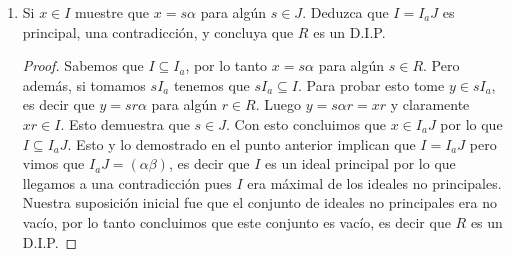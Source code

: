 \documentclass[letter,twoside,12pt]{article}
\begin{document}
\begin{enumerate}[label=\textbf{(\alph*)}]
\begin{proof}
Para demostrar que $ J $ es un ideal tomemos $ c,d \in J $, y tomemos $ x \in (d - c)I_a  $. Entonces $x = (d-c)e $ con $ e \in I_a $. Pero $ x = ce-de $ y vemos que $ce$ y $de \in I$. Por lo tanto, como $I$ es cerrado bajo resta $ x=cd-bd \in I $. Por lo tanto $J$ también es cerrado bajo resta. Por una demostración similar podemos mostrar que $rj \in J$ con $r \in R$ y $ j \in J $. Luego $ J $ es un ideal. Además tenemos que $ I \subseteq J $, pues si tomamos $ i \in I $ entonces $iI_j \subseteq I$ es trivial porque $I$ es un ideal. Pero la contenencia es estricta pues $ b \in J $ y $b \not  \in I$ por nuestra suposición. En efecto tomemos $ bI_a $, y tomemos cualquier elemento $x \in bI_a$. Entonces $x=b(i+ra)$, con $ i \in I $, y $r \in R$. Esto también muestra que $ I_b \in J$. Por lo tanto, $x=ib+rab$ pertenece a $ I $ porque $ i $ y $ab$ estan en $ I $. Luego $J$ también es un ideal principal porque si no lo fuera contradeciría la maximalidad de $ I $.

Por ultimo, probemos que $ (\alpha\beta) \subseteq I $. En efecto, $ \beta \in J $ luego tenemos que $ \beta I_a \subseteq I$ y $\alpha \in I_a$ por lo que $ \beta\alpha \in I $.
\end{proof}
\item Si $ x \in I $ muestre que $ x = s\alpha $ para algún $ s \in J $. Deduzca que $ I = I_aJ $ es principal, una contradicción, y concluya que $ R $ es un D.I.P.

\begin{proof}
Sabemos que $ I \subseteq I_a $, por lo tanto $x=s\alpha$ para algún $ s \in R $. Pero además, si tomamos $sI_a$ tenemos que $sI_a \subseteq I$. Para probar esto tome $y \in sI_a$, es decir que $ y = sr\alpha $ para algún $r \in R$. Luego $y = s\alpha r = xr$ y claramente $ xr \in I $. Esto demuestra que $ s \in J $. Con esto concluimos que $x \in I_aJ$ por lo que $ I \subseteq I_aJ $. Esto y lo demostrado en el punto anterior implican que $I = I_aJ$ pero vimos que $ I_aJ = (\alpha\beta)$, es decir que $ I $ es un ideal principal por lo que llegamos a una contradicción pues $I$ era máximal de los ideales no principales. Nuestra suposición inicial fue que el conjunto de ideales no principales era no vacío, por lo tanto concluimos que este conjunto es vacío, es decir que $ R $ es un D.I.P.
\end{proof}

\end{enumerate}
\end{document}
